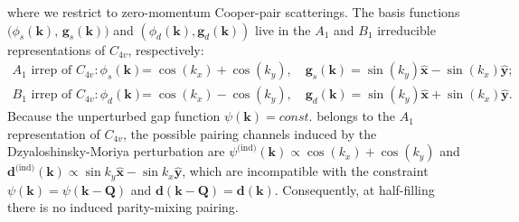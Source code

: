 \documentclass[11pt]{article}
\begin{document}
where we restrict to zero-momentum Cooper-pair scatterings. The basis functions
$(\phi_s(\bm k)$, $\bm g_s(\bm k))$ and $(\phi_d(\bm k), \bm g_d(\bm k))$ live in the
$A_1$ and $B_1$ irreducible representations of $C_{4v}$, respectively:
\begin{align}
A_1 \text{ irrep of } C_{4v}:
\phi_s(\bm k) &= \cos(k_x) + \cos(k_y),
\quad \bm g_s(\bm k) = \sin(k_y)\hat{\bm x} - \sin(k_x) \hat{\bm y};\\
B_1 \text{ irrep of } C_{4v}:
\phi_d(\bm k) &= \cos(k_x) - \cos(k_y),
\quad \bm g_d(\bm k) = \sin(k_y)\hat{\bm x} + \sin(k_x) \hat{\bm y}.
\end{align}
Because the unperturbed gap function $\psi(\bm k) = const.$ belongs to
the $A_1$ representation of $C_{4v}$, the possible pairing channels induced
by the Dzyaloshinsky-Moriya perturbation
are $\psi^{\text{(ind)}}(\bm k) \propto \cos(k_x) + \cos(k_y)$
and $\bm d^{\text{(ind)}}(\bm k) \propto \sin k_y \hat{\bm x} - \sin k_x \hat{\bm y}$,
which are incompatible with
the constraint $\psi(\bm k) = \psi(\bm k - \bm Q)$ and $\bm d(\bm k - \bm Q) = \bm d(\bm k)$.
Consequently, at half-filling there is no induced parity-mixing pairing.
\end{document}
